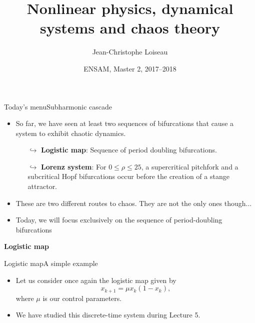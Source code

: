 \documentclass[usenames,dvipsnames,svgnames,10pt,aspectratio=169]{beamer}
\title[Nonlinear Physics] %
{
	Nonlinear physics, dynamical \\ systems and chaos theory
}
\author[J.-Ch.~Loiseau] %
{
	Jean-Christophe Loiseau
}
\institute[unused]
{
	\url{jean-christophe.loiseau@ensam.eu} \\
	DynFluid, \\
	Arts et M\'etiers ParisTech, France
}
\date[unused]{ENSAM, Master 2, 2017--2018}
\begin{document}
\titleframe %


\begin{frame}[t, c]{Today's menu}{Subharmonic cascade}
	\begin{itemize}
		\item So far, we have seen at least two sequences of bifurcations that cause a system to exhibit chaotic dynamics.
		\begin{itemize}
			\item[$\hookrightarrow$] \alert{\textbf{Logistic map}}: Sequence of period doubling bifurcations.
			\item[$\hookrightarrow$] \alert{\textbf{Lorenz system}}: For $0 \leq \rho \leq 25$, a supercritical pitchfork and a subcritical Hopf bifurcations occur before the creation of a stange attractor.
		\end{itemize}

		\bigskip

		\item These are two different routes to chaos. They are not the only ones though...

		\bigskip

		\item Today, we will focus exclusively on the sequence of period-doubling bifurcations
	\end{itemize}

	\vspace{1cm}
\end{frame}

\begin{frame}[t, c]{}
	\centering
	\vspace{1cm}

	{\Large \textbf{Logistic map}}

	\bigskip

	{}

\end{frame}

\begin{frame}[t, c]{Logistic map}{A simple example}
	\begin{itemize}
		\item Let us consider once again the logistic map given by
		$$x_{k+1} = \mu x_k ( 1 - x_k),$$
		where $\mu$ is our control parameters.

		\bigskip

		\item We have studied this discrete-time system during Lecture 5.
	\end{itemize}

	\vspace{1cm}
\end{frame}
\end{document}
